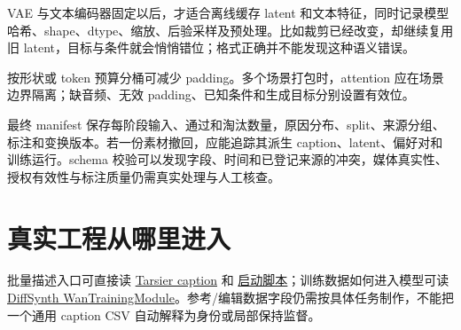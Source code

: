 VAE 与文本编码器固定以后，才适合离线缓存 latent 和文本特征，同时记录模型哈希、shape、dtype、缩放、后验采样及预处理。比如裁剪已经改变，却继续复用旧 latent，目标与条件就会悄悄错位；格式正确并不能发现这种语义错误。

按形状或 token 预算分桶可减少 padding。多个场景打包时，attention 应在场景边界隔离；缺音频、无效 padding、已知条件和生成目标分别设置有效位。

最终 manifest 保存每阶段输入、通过和淘汰数量，原因分布、split、来源分组、标注和变换版本。若一份素材撤回，应能追踪其派生 caption、latent、偏好对和训练运行。schema 校验可以发现字段、时间和已登记来源的冲突，媒体真实性、授权有效性与标注质量仍需真实处理与人工核查。

\section{真实工程从哪里进入}\label{seedance-m11-ux771fux5b9eux5de5ux7a0bux4eceux54eaux91ccux8fdbux5165}

批量描述入口可直接读 \href{https://github.com/bytedance/tarsier/blob/63de87a760c2aec6b31470a08046969a13787126/tasks/inference_caption.py}{Tarsier caption} 和 \href{https://github.com/bytedance/tarsier/blob/63de87a760c2aec6b31470a08046969a13787126/scripts/run_inference_caption.sh}{启动脚本}；训练数据如何进入模型可读 \href{https://github.com/modelscope/DiffSynth-Studio/blob/d32f72424cd22bc0ea8100cc57559149b4eac933/examples/wanvideo/model_training/train.py}{DiffSynth WanTrainingModule}。参考/编辑数据字段仍需按具体任务制作，不能把一个通用 caption CSV 自动解释为身份或局部保持监督。
